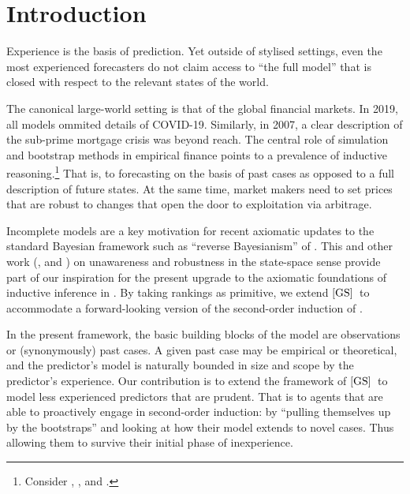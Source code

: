 \documentclass[12pt,a4paper,twoside]{article}
\newcommand{\gsii}{$\textup{[GS]}$}
\begin{document}
\section{Introduction}\label{sec-introduction}
Experience is the basis of prediction.  Yet outside of stylised settings, even
the most experienced forecasters do not claim  access to ``the full
model'' that is closed  with respect to the relevant states of the
world.
\begin{example}\label{eg-full-model}
  The canonical large-world setting is that of the global financial markets.  In
  2019, all models ommited details of COVID-19. Similarly, in 2007, a clear
  description of the sub-prime mortgage crisis was beyond reach. The central
  role of simulation and bootstrap methods in empirical finance points to a
  prevalence of inductive reasoning.\footnote{Consider
    \citet{Cowles-Forecasting}, \citet{White-Data_snooping},
    \citet{FF-Luck_vs_skill} and \citet{HL-Lucky_factors}.} That is, to
  forecasting on the basis of past cases as opposed to a full description of
  future states. At the same time, market makers need to set prices that
  are robust to changes that open the door to exploitation via arbitrage.
\end{example} 
 \setcounter{page}{2} Incomplete models are a key
motivation for recent axiomatic updates to the standard Bayesian framework such
as ``reverse Bayesianism'' of \citet{KV_Reverse_Bayes}. This and other work
(\citet{KV-Awareness_of_U}, \citet{HR-Knowledge_of_U} and
\citet{GKMQT_Robust_experiments}) on unawareness and robustness in the
state-space sense provide part of our inspiration for the present upgrade to the
axiomatic foundations of inductive inference in \citet[henceforth
\gsii]{GS_Inductive_inference}. By taking rankings as primitive, we extend
\gsii\ to accommodate a forward-looking version of the second-order induction of
\citet{AG-Second-order_induction}. 

In the present framework, the basic building blocks of the model are
observations or (synonymously) past cases. A given past case may be empirical or
theoretical, and the predictor's model is naturally bounded in size and scope by
the predictor's experience. Our contribution is to extend the framework of
\gsii\ to model less experienced predictors that are prudent. That is to agents
that are able to proactively engage in second-order induction: by ``pulling
themselves up by the bootstraps'' and looking at how their model extends to
novel cases. Thus allowing them to survive their initial phase of inexperience.
\end{document}
